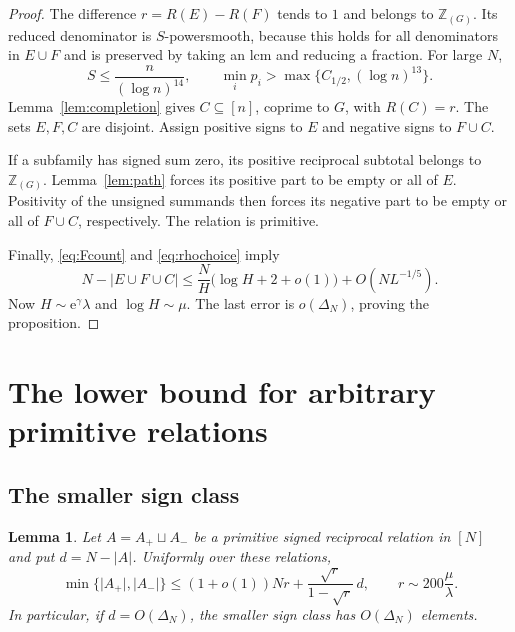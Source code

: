 \documentclass[11pt,leqno]{amsart}
\numberwithin{equation}{section}
\newtheorem{lemma}[theorem]{Lemma}
\theoremstyle{definition}
\theoremstyle{remark}
\newcommand{\Z}{\mathbb Z}
\newcommand{\e}{\mathrm e}
\newcommand{\card}[1]{\lvert #1\rvert}
\begin{document}
\begin{proof}
The difference $r=R(E)-R(F)$ tends to $1$ and belongs to $\Z_{(G)}$.
Its reduced denominator is $S$-powersmooth, because this holds for all
denominators in $E\cup F$ and is preserved by taking an lcm and reducing
a fraction. For large $N$,
\[
 S\le\frac{n}{(\log n)^{14}},\qquad
 \min_i p_i>\max\{C_{1/2},(\log n)^{13}\}.
\]
Lemma~\ref{lem:completion} gives $C\subseteq[n]$, coprime to $G$, with
$R(C)=r$. The sets $E,F,C$ are disjoint. Assign positive signs to $E$
and negative signs to $F\cup C$.

If a subfamily has signed sum zero, its positive reciprocal subtotal
belongs to $\Z_{(G)}$. Lemma~\ref{lem:path} forces its positive part
to be empty or all of $E$. Positivity of the unsigned summands then
forces its negative part to be empty or all of $F\cup C$, respectively.
The relation is primitive.

Finally, \eqref{eq:Fcount} and \eqref{eq:rhochoice} imply
\[
 N-\card{E\cup F\cup C}
 \le\frac{N}{H}\bigl(\log H+2+o(1)\bigr)+O(NL^{-1/5}).
\]
Now $H\sim\e^\gamma\lambda$ and $\log H\sim\mu$.
The last error is $o(\Delta_N)$, proving the proposition.
\end{proof}

\section{The lower bound for arbitrary primitive relations}\label{sec:lower}

\subsection{The smaller sign class}

\begin{lemma}\label{lem:minority}
Let $A=A_+\sqcup A_-$ be a primitive signed reciprocal relation in $[N]$
and put $d=N-\card A$. Uniformly over these relations,
\begin{equation}\label{eq:minority}
 \min\{\card{A_+},\card{A_-}\}
 \le (1+o(1))Nr+\frac{\sqrt r}{1-\sqrt r}\,d,
 \qquad r\sim200\frac\mu\lambda.
\end{equation}
In particular, if $d=O(\Delta_N)$, the smaller sign class has
$O(\Delta_N)$ elements.
\end{lemma}
\end{document}
